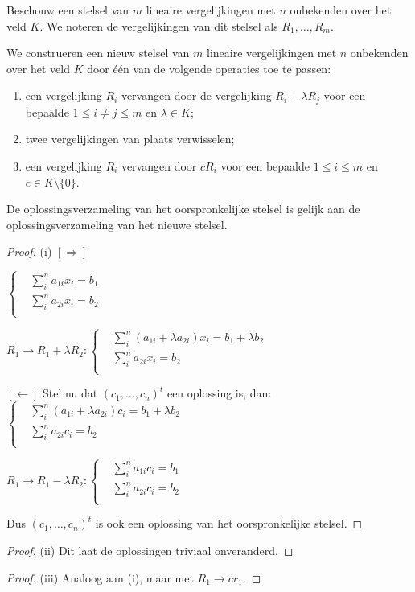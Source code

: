 \begin{lemma}[1.4.2]
    Beschouw een stelsel van $m$ lineaire vergelijkingen met $n$ onbekenden over het veld $K$. We noteren de vergelijkingen van dit stelsel als $R_1, \dots, R_m$.

    We construeren een nieuw stelsel van $m$ lineaire vergelijkingen met $n$ onbekenden over het veld $K$ door één van de volgende operaties toe te passen:
    \begin{enumerate}
        \item[(i)] een vergelijking $R_i$ vervangen door de vergelijking $R_i + \lambda R_j$ voor een bepaalde $1 \le i \neq j \le m$ en $\lambda \in K$;
        \item[(ii)] twee vergelijkingen van plaats verwisselen;
        \item[(iii)] een vergelijking $R_i$ vervangen door $cR_i$ voor een bepaalde $1 \le i \le m$ en $c \in K \setminus \{0\}$.
    \end{enumerate}
    De oplossingsverzameling van het oorspronkelijke stelsel is gelijk aan de oplossingsverzameling van het nieuwe stelsel.
\end{lemma}
\begin{proof}(i)
    \([\Rightarrow]\)

  \(
    \begin{cases}
       & \sum_i^n a_{1i}x_i = b_1\\
       & \sum_i^n a_{2i}x_i = b_2\\
    \end{cases}
  \)

  \(R_1 \to R_1 + \lambda R_2:
    \begin{cases}
       & \sum_i^n \left(a_{1i} +\lambda a_{2i} \right)x_i = b_1 + \lambda b_2\\
       & \sum_i^n a_{2i}x_i = b_2\\
    \end{cases}
  \)

  \([\leftarrow]\) Stel nu dat \((c_1,\dots,c_n)^t\) een oplossing is, dan:
  \(
  \begin{cases}
       & \sum_i^n \left(a_{1i} +\lambda a_{2i} \right)c_i = b_1 + \lambda b_2\\
       & \sum_i^n a_{2i}c_i = b_2\\
    \end{cases}
  \)

   \(R_1 \to R_1 - \lambda R_2:
   \begin{cases}
       & \sum_i^n a_{1i}c_i = b_1\\
       & \sum_i^n a_{2i}c_i = b_2\\
    \end{cases}  \)

    Dus \((c_1,\dots,c_n)^t\) is ook een oplossing van het oorspronkelijke stelsel.
\end{proof}
\begin{proof}(ii)
    Dit laat de oplossingen triviaal onveranderd.
\end{proof}
\begin{proof}(iii)
    Analoog aan (i), maar met \(R_1 \to c r_1\).
\end{proof}

